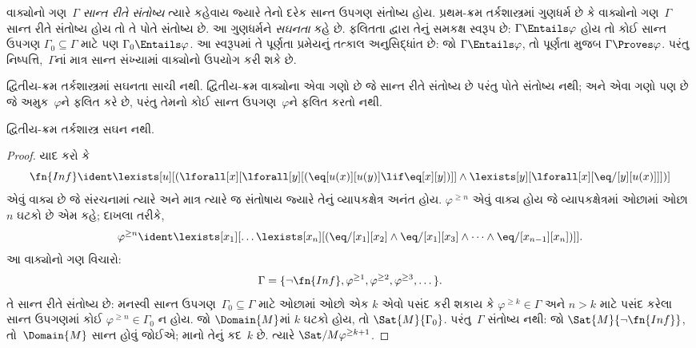 \begin{explain}
વાક્યોનો ગણ~$\Gamma$ \emph{સાન્ત રીતે સંતોષ્ય} ત્યારે કહેવાય જ્યારે
તેનો દરેક સાન્ત ઉપગણ સંતોષ્ય હોય. પ્રથમ-ક્રમ તર્કશાસ્ત્રમાં ગુણધર્મ છે
કે વાક્યોનો ગણ~$\Gamma$ સાન્ત રીતે સંતોષ્ય હોય તો તે પોતે
સંતોષ્ય છે. આ ગુણધર્મને \emph{સઘનતા} કહે છે. ફલિતતા દ્વારા તેનું
સમકક્ષ સ્વરૂપ છે: $\Gamma \Entails \varphi$ હોય તો કોઈ સાન્ત ઉપગણ
$\Gamma_0 \subseteq \Gamma$ માટે પણ $\Gamma_0 \Entails
\varphi$. આ સ્વરૂપમાં તે પૂર્ણતા પ્રમેયનું તત્કાલ અનુસિદ્ધાંત છે: જો
$\Gamma \Entails \varphi$, તો પૂર્ણતા મુજબ $\Gamma \Proves \varphi$. પરંતુ
નિષ્પત્તિ,~$\Gamma$નાં માત્ર સાન્ત સંખ્યામાં વાક્યોનો
ઉપયોગ કરી શકે છે.

દ્વિતીય-ક્રમ તર્કશાસ્ત્રમાં સઘનતા સાચી નથી. દ્વિતીય-ક્રમ
વાક્યોના એવા ગણો છે જે સાન્ત રીતે સંતોષ્ય છે પરંતુ પોતે
સંતોષ્ય નથી; અને એવા ગણો પણ છે જે અમુક~$\varphi$ને ફલિત કરે છે,
પરંતુ તેમનો કોઈ સાન્ત ઉપગણ~$\varphi$ને ફલિત કરતો નથી.
\end{explain}


\begin{thm}
દ્વિતીય-ક્રમ તર્કશાસ્ત્ર સઘન નથી.
\end{thm}

\begin{proof}
યાદ કરો કે
\[
\fn{Inf} \ident \lexists[u][(\lforall[x][\lforall[y][(\eq[u(x)][u(y)]
      \lif \eq[x][y])]] \land \lexists[y][\lforall[x][\eq/[y][u(x)]]])]
\]
એવું વાક્ય છે જે સંરચનામાં ત્યારે અને માત્ર ત્યારે જ
સંતોષાય જ્યારે તેનું વ્યાપકક્ષેત્ર અનંત હોય. $\varphi^{\ge n}$ એવું
વાક્ય હોય જે વ્યાપકક્ષેત્રમાં ઓછામાં ઓછા $n$ ઘટકો છે એમ કહે;
દાખલા તરીકે,
\[
\varphi^{\ge n} \ident \lexists[x_1][\dots\lexists[x_n][(\eq/[x_1][x_2]
    \land \eq/[x_1][x_3] \land \dots \land \eq/[x_{n-1}][x_n])]].
\]
આ વાક્યોનો ગણ વિચારો:
\[
\Gamma = \{\lnot \fn{Inf}, \varphi^{\ge 1}, \varphi^{\ge 2}, \varphi^{\ge 3}, \dots\}.
\]
તે સાન્ત રીતે સંતોષ્ય છે: મનસ્વી સાન્ત ઉપગણ~$\Gamma_0
\subseteq \Gamma$ માટે ઓછામાં ઓછો એક $k$ એવો પસંદ કરી શકાય કે
$\varphi^{\ge k} \in \Gamma$ અને $n>k$ માટે પસંદ કરેલા સાન્ત ઉપગણમાં
કોઈ $\varphi^{\ge n}
\in \Gamma_0$ ન હોય. જો $\Domain{M}$માં $k$ ઘટકો હોય,
તો $\Sat{M}{\Gamma_0}$. પરંતુ~$\Gamma$ સંતોષ્ય નથી: જો
$\Sat{M}{\lnot \fn{Inf}}$, તો~$\Domain{M}$ સાન્ત હોવું જોઈએ;
માનો તેનું કદ~$k$ છે. ત્યારે $\Sat/{M}{\varphi^{\ge k+1}}$.
\end{proof}

